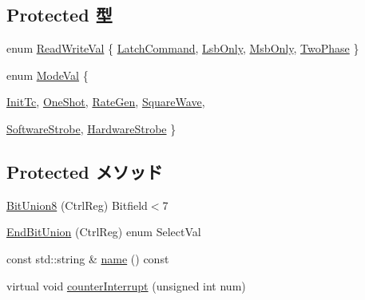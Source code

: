 \subsection*{Protected 型}
\begin{DoxyCompactItemize}
\item 
enum \hyperlink{classIntel8254Timer_aed053e10f24c359c1ea7b060a714339f}{ReadWriteVal} \{ \hyperlink{classIntel8254Timer_aed053e10f24c359c1ea7b060a714339fa30eb4f2952b9b79d3c48e297ae06b4f5}{LatchCommand}, 
\hyperlink{classIntel8254Timer_aed053e10f24c359c1ea7b060a714339fabf45246d5c93284b4bc518d0d4803864}{LsbOnly}, 
\hyperlink{classIntel8254Timer_aed053e10f24c359c1ea7b060a714339fa9e88706199b2cd29b7185d09a759f8c1}{MsbOnly}, 
\hyperlink{classIntel8254Timer_aed053e10f24c359c1ea7b060a714339fa0cc3b0f4f2d6dedd50750ada186d6776}{TwoPhase}
 \}
\item 
enum \hyperlink{classIntel8254Timer_ade72aac01b93a533c67f2d838380f169}{ModeVal} \{ \par
\hyperlink{classIntel8254Timer_ade72aac01b93a533c67f2d838380f169a268d29ced59b5284d2edd1a0707a29e8}{InitTc}, 
\hyperlink{classIntel8254Timer_ade72aac01b93a533c67f2d838380f169a36ae814a509f7c49424ba9fad582d51f}{OneShot}, 
\hyperlink{classIntel8254Timer_ade72aac01b93a533c67f2d838380f169a0b0d2e12b569f75e81e99716f8f22e6b}{RateGen}, 
\hyperlink{classIntel8254Timer_ade72aac01b93a533c67f2d838380f169aeab039eec57a61fa4fa9da6512b143ee}{SquareWave}, 
\par
\hyperlink{classIntel8254Timer_ade72aac01b93a533c67f2d838380f169a640b1a596038afefb7a68e225ad4a636}{SoftwareStrobe}, 
\hyperlink{classIntel8254Timer_ade72aac01b93a533c67f2d838380f169a404427193131b86eafc33e4a85bf36e3}{HardwareStrobe}
 \}
\end{DoxyCompactItemize}
\subsection*{Protected メソッド}
\begin{DoxyCompactItemize}
\item 
\hyperlink{classIntel8254Timer_ac1f155872c59c72c493afcab2c4e5211}{BitUnion8} (CtrlReg) Bitfield$<$7
\item 
\hyperlink{classIntel8254Timer_a053be9dcb79639ccf7e3554b86d8b62c}{EndBitUnion} (CtrlReg) enum SelectVal
\item 
const std::string \& \hyperlink{classIntel8254Timer_a324e8c54c4c5161913681a1a52fef959}{name} () const 
\item 
virtual void \hyperlink{classIntel8254Timer_a3c6698d5809816aa5101e57421d910d5}{counterInterrupt} (unsigned int num)
\end{DoxyCompactItemize}
